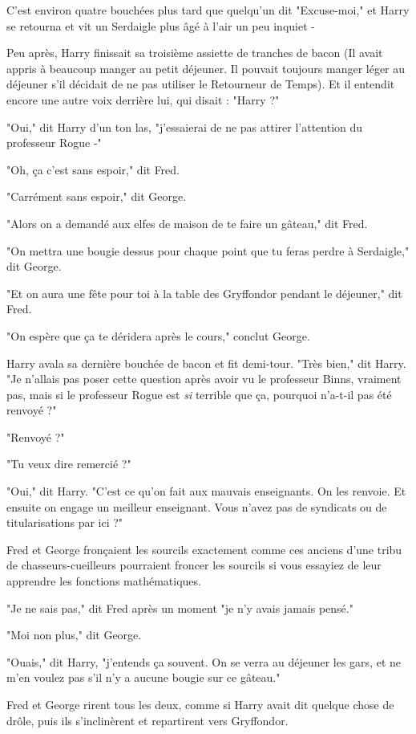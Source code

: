 C'est environ quatre bouchées plus tard que quelqu'un dit "Excuse-moi," et Harry se retourna et vit un Serdaigle plus âgé à l'air un peu inquiet -

Peu après, Harry finissait sa troisième assiette de tranches de bacon (Il avait appris à beaucoup manger au petit déjeuner. Il pouvait toujours manger léger au déjeuner s'il décidait de ne pas utiliser le Retourneur de Temps). Et il entendit encore une autre voix derrière lui, qui disait : "Harry ?"

"Oui," dit Harry d'un ton las, "j'essaierai de ne pas attirer l'attention du professeur Rogue -"

"Oh, ça c'est sans espoir," dit Fred.

"Carrément sans espoir," dit George.

"Alors on a demandé aux elfes de maison de te faire un gâteau," dit Fred.

"On mettra une bougie dessus pour chaque point que tu feras perdre à Serdaigle," dit George.

"Et on aura une fête pour toi à la table des Gryffondor pendant le déjeuner," dit Fred.

"On espère que ça te déridera après le cours," conclut George.

Harry avala sa dernière bouchée de bacon et fit demi-tour. "Très bien," dit Harry. "Je n'allais pas poser cette question après avoir vu le professeur Binns, vraiment pas, mais si le professeur Rogue est \emph{si}  terrible que ça, pourquoi n'a-t-il pas été renvoyé ?"

"Renvoyé ?"

"Tu veux dire remercié ?"

"Oui," dit Harry. "C'est ce qu'on fait aux mauvais enseignants. On les renvoie. Et ensuite on engage un meilleur enseignant. Vous n'avez pas de syndicats ou de titularisations par ici ?"

Fred et George fronçaient les sourcils exactement comme ces anciens d'une tribu de chasseurs-cueilleurs pourraient froncer les sourcils si vous essayiez de leur apprendre les fonctions mathématiques.

"Je ne sais pas," dit Fred après un moment "je n'y avais jamais pensé."

"Moi non plus," dit George.

"Ouais," dit Harry, "j'entends ça souvent. On se verra au déjeuner les gars, et ne m'en voulez pas s'il n'y a aucune bougie sur ce gâteau."

Fred et George rirent tous les deux, comme si Harry avait dit quelque chose de drôle, puis ils s'inclinèrent et repartirent vers Gryffondor.

